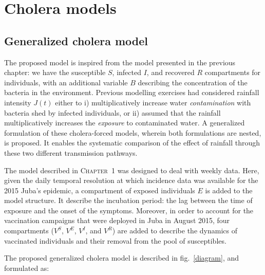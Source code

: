 \section{Cholera models}
\label{sec:meth}
\subsection{Generalized cholera model}
The proposed model is inspired from the model presented in the previous chapter: we have the susceptible $S$, infected $I$, and recovered $R$ compartments for individuals, with an additional variable $B$ describing the concentration of the bacteria in the environment. Previous modelling exercises had considered rainfall intensity $J(t)$ either to i) multiplicatively increase water \textit{contamination} with bacteria shed by infected  individuals\cite{Bertuzzo:ProbabilityExtinctionHaiti:2016,Pasetto:RealtimeProjectionsCholera:2017}, or ii) assumed that the rainfall multiplicatively increases the \textit{exposure} to contaminated water\cite{Eisenberg:ExaminingRainfallCholera:2013}. A generalized formulation of these cholera-forced models, wherein both formulations are nested, is proposed. It enables the systematic comparison of the effect of rainfall through these two different transmission pathways.

The model described in \textsc{Chapter~1} was designed to deal with weekly data. Here, given the daily temporal resolution at which incidence data was available for the 2015 Juba's epidemic, a compartment of exposed individuals $E$ is added to the model structure. It describe the incubation period: the lag between the time of exposure and the onset of the symptoms. Moreover, in order to account for the vaccination campaigns that were deployed in Juba in August 2015, four compartments ($V^S$, $V^E$, $V^I$, and $V^R$) are added to describe the dynamics of vaccinated individuals and their removal from the pool of susceptibles.

The proposed generalized cholera model is described in fig.~\ref{diagram}, and formulated as:

